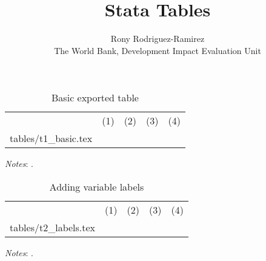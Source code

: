 \documentclass{article}
\makeatletter
\newcommand\primitiveinput[1]
{\@@input #1 }
\makeatother
\begin{document}
\title{Stata Tables}
\author{Rony Rodriguez-Ramirez\\{\normalsize The World Bank, Development Impact Evaluation Unit}}
\maketitle
\listoftables
\newpage
\begin{table}[H]
	\centering
	\label{tab:Table}
	\begin{adjustbox}{max width=\linewidth}
		\begin{threeparttable}
			\caption{Basic exported table}
			\begin{tabular}{@{}l*{4}{c}@{}}
                \toprule
                \toprule 
				& (1) & (2) & (3) & (4) \\
				\primitiveinput{tables/t1_basic.tex}
				\bottomrule
			\end{tabular}
			\begin{tablenotes}
				\setlength{}
				\footnotesize
				\item \textit{Notes}: \lipsum[1].
			\end{tablenotes}
		\end{threeparttable}
	\end{adjustbox}
\end{table}
\begin{table}[H]
	\centering
	\label{tab:Table}
	\begin{adjustbox}{max width=\linewidth}
		\begin{threeparttable}
			\caption{Adding variable labels}
			\begin{tabular}{@{}l*{4}{c}@{}}
                \toprule
                \toprule 
				& (1) & (2) & (3) & (4) \\
				\primitiveinput{tables/t2_labels.tex}
				\bottomrule
			\end{tabular}
			\begin{tablenotes}
				\setlength\labelsep{0pt}
				\footnotesize
				\item \textit{Notes}: \lipsum[1].
			\end{tablenotes}
		\end{threeparttable}
	\end{adjustbox}
\end{table}
\end{document}
